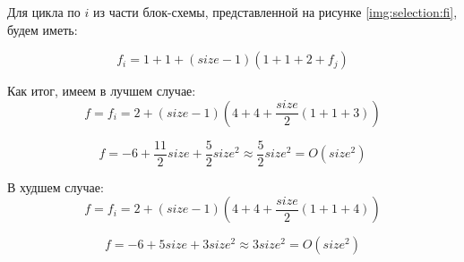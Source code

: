 \documentclass[12pt]{report}
\begin{document}
Для цикла по $i$ из части блок-схемы, представленной на рисунке \ref{img:selection:fi}, будем иметь:

\begin{equation}
f_{i} = 1 + 1 + (size - 1)(1 + 1 + 2 + f_{j})
\end{equation}

Как итог, имеем в лучшем случае:
\begin{equation}
f = f_{i} = 2 + (size - 1)(4 + 4 + \frac{size}{2}(1 + 1 + 3))
\end{equation}

\begin{equation}
f = -6 + \frac{11}{2}size + \frac{5}{2}{size}^2 \approx \frac{5}{2}{size}^2 = O({size}^2)
\end{equation}

В худшем случае:
\begin{equation}
f = f_{i} = 2 + (size - 1)(4 + 4 + \frac{size}{2}(1 + 1 + 4))
\end{equation}

\begin{equation}
f = -6 + 5size + 3{size}^2 \approx 3{size}^2 = O({size}^2)
\end{equation}
\end{document}
